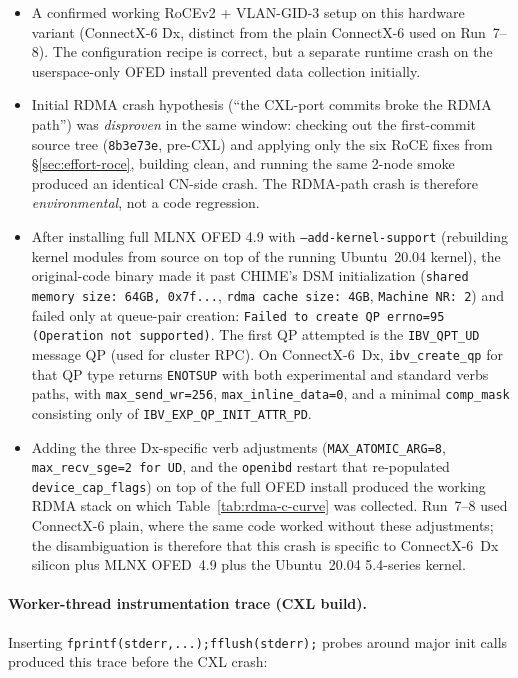 \documentclass[11pt,a4paper]{article}
\begin{document}
\begin{itemize}[nosep]
    \item A confirmed working RoCEv2 + VLAN-GID-3 setup on this hardware variant (ConnectX-6 Dx, distinct from the plain ConnectX-6 used on Run~7--8). The configuration recipe is correct, but a separate runtime crash on the userspace-only OFED install prevented data collection initially.
    \item Initial RDMA crash hypothesis (``the CXL-port commits broke the RDMA path'') was \emph{disproven} in the same window: checking out the first-commit source tree (\texttt{8b3e73e}, pre-CXL) and applying only the six RoCE fixes from §\ref{sec:effort-roce}, building clean, and running the same 2-node smoke produced an identical CN-side crash. The RDMA-path crash is therefore \emph{environmental}, not a code regression.
    \item After installing full MLNX OFED 4.9 with \texttt{--add-kernel-support} (rebuilding kernel modules from source on top of the running Ubuntu~20.04 kernel), the original-code binary made it past CHIME's DSM initialization (\texttt{shared memory size: 64GB, 0x7f...}, \texttt{rdma cache size: 4GB}, \texttt{Machine NR: 2}) and failed only at queue-pair creation: \texttt{Failed to create QP errno=95 (Operation not supported)}. The first QP attempted is the \texttt{IBV\_QPT\_UD} message QP (used for cluster RPC). On ConnectX-6~Dx, \texttt{ibv\_create\_qp} for that QP type returns \texttt{ENOTSUP} with both experimental and standard verbs paths, with \texttt{max\_send\_wr=256}, \texttt{max\_inline\_data=0}, and a minimal \texttt{comp\_mask} consisting only of \texttt{IBV\_EXP\_QP\_INIT\_ATTR\_PD}.
    \item Adding the three Dx-specific verb adjustments (\texttt{MAX\_ATOMIC\_ARG=8}, \texttt{max\_recv\_sge=2 for UD}, and the \texttt{openibd} restart that re-populated \texttt{device\_cap\_flags}) on top of the full OFED install produced the working RDMA stack on which Table~\ref{tab:rdma-c-curve} was collected. Run~7--8 used ConnectX-6 plain, where the same code worked without these adjustments; the disambiguation is therefore that this crash is specific to ConnectX-6~Dx silicon plus MLNX OFED~4.9 plus the Ubuntu~20.04 5.4-series kernel.
\end{itemize}

\paragraph{Worker-thread instrumentation trace (CXL build).} Inserting \texttt{fprintf(stderr,...);fflush(stderr);} probes around major init calls produced this trace before the CXL crash:
\end{document}
